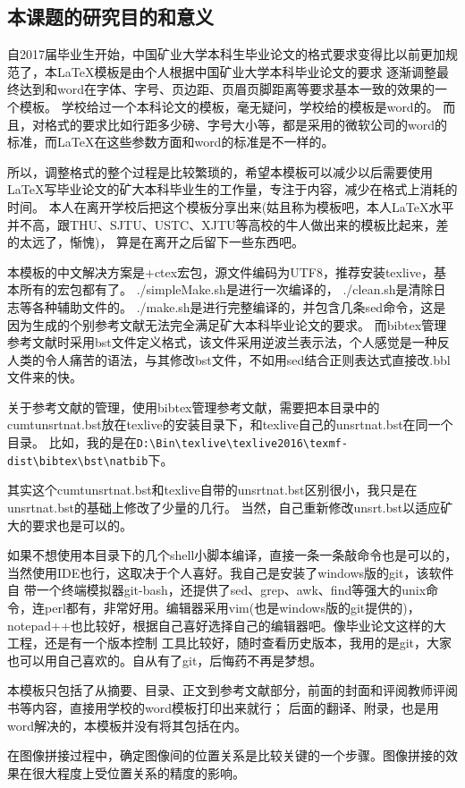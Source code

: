 \documentclass[10.5pt,a4paper]{article}
\numberwithin{equation}{section}
\numberwithin{figure}{section}
\numberwithin{table}{section}
\begin{document}
\subsection{本课题的研究目的和意义}
自2017届毕业生开始，中国矿业大学本科生毕业论文的格式要求变得比以前更加规范了，本\LaTeX{}模板是由个人根据中国矿业大学本科毕业论文的要求%
逐渐调整最终达到和word在字体、字号、页边距、页眉页脚距离等要求基本一致的效果的一个模板。
学校给过一个本科论文的模板，毫无疑问，学校给的模板是word的。
而且，对格式的要求比如行距多少磅、字号大小等，都是采用的微软公司的word的标准，而\LaTeX{}在这些参数方面和word的标准是不一样的。
\par
所以，调整格式的整个过程是比较繁琐的，希望本模板可以减少以后需要使用\LaTeX{}写毕业论文的矿大本科毕业生的工作量，专注于内容，减少在格式上消耗的时间。
本人在离开学校后把这个模板分享出来(姑且称为模板吧，本人\LaTeX{}水平并不高，跟THU、SJTU、USTC、XJTU等高校的牛人做出来的模板比起来，差的太远了，惭愧)，
算是在离开之后留下一些东西吧。
\par
本模板的中文解决方案是\XeLaTeX{}+ctex宏包，源文件编码为UTF8，推荐安装texlive，基本所有的宏包都有了。
./simpleMake.sh是进行一次编译的， ./clean.sh是清除日志等各种辅助文件的。
./make.sh是进行完整编译的，并包含几条sed命令，这是因为生成的个别参考文献无法完全满足矿大本科毕业论文的要求。
而bibtex管理参考文献时采用bst文件定义格式，该文件采用逆波兰表示法，个人感觉是一种反人类的令人痛苦的语法，与其修改bst文件，不如用sed结合正则表达式直接改.bbl文件来的快。\par
关于参考文献的管理，使用bibtex管理参考文献，需要把本目录中的cumtunsrtnat.bst放在texlive的安装目录下，和texlive自己的unsrtnat.bst在同一个目录。
比如，我的是在\verb|D:\Bin\texlive\texlive2016\texmf-dist\bibtex\bst\natbib|下。\par
其实这个cumtunsrtnat.bst和texlive自带的unsrtnat.bst区别很小，我只是在unsrtnat.bst的基础上修改了少量的几行。
当然，自己重新修改unsrt.bst以适应矿大的要求也是可以的。
\par
如果不想使用本目录下的几个shell小脚本编译，直接一条一条敲命令也是可以的，当然使用IDE也行，这取决于个人喜好。我自己是安装了windows版的git，该软件自
带一个终端模拟器git-bash，还提供了sed、grep、awk、find等强大的unix命令，连perl都有，非常好用。编辑器采用vim(也是windows版的git提供的)，notepad++也比较好，根据自己喜好选择自己的编辑器吧。像毕业论文这样的大工程，还是有一个版本控制
工具比较好，随时查看历史版本，我用的是git，大家也可以用自己喜欢的。自从有了git，后悔药不再是梦想。
\par
本模板只包括了从摘要、目录、正文到参考文献部分，前面的封面和评阅教师评阅书等内容，直接用学校的word模板打印出来就行；
后面的翻译、附录，也是用word解决的，本模板并没有将其包括在内。
\par
在图像拼接过程中，确定图像间的位置关系是比较关键的一个步骤。图像拼接的效果在很大程度上受位置关系的精度的影响\cite{zagrouba2009efficient,chen2014optimization}。\par
\end{document}
